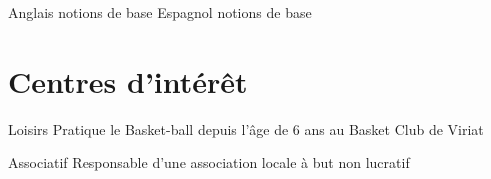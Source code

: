 \documentclass[10pt,a4paper]{moderncv}
\begin{document}
\cvcomputer
	{Anglais}
	{notions de base}
	{Espagnol}
	{notions de base}



\section{Centres d'intérêt}

\cvline
	{Loisirs}
	{Pratique le Basket-ball depuis l'âge de 6 ans au Basket Club de Viriat}

\cvline
	{Associatif}
	{Responsable d'une association locale à but non lucratif}

\end{document}
